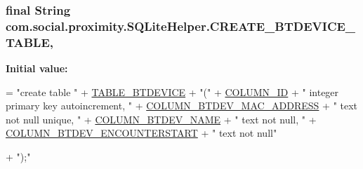 \subsubsection[{C\+R\+E\+A\+T\+E\+\_\+\+B\+T\+D\+E\+V\+I\+C\+E\+\_\+\+T\+A\+B\+L\+E}]{\setlength{\rightskip}{0pt plus 5cm}final String com.\+social.\+proximity.\+S\+Q\+Lite\+Helper.\+C\+R\+E\+A\+T\+E\+\_\+\+B\+T\+D\+E\+V\+I\+C\+E\+\_\+\+T\+A\+B\+L\+E\hspace{0.3cm}{\ttfamily [static]}, {\ttfamily [private]}}\label{classcom_1_1social_1_1proximity_1_1_s_q_lite_helper_a008345746681ebe4ff451e164809f343}
{\bfseries Initial value\+:}
\begin{DoxyCode}
= \textcolor{stringliteral}{"create table "}
              + \hyperlink{classcom_1_1social_1_1proximity_1_1_s_q_lite_helper_a5826d20868ba7e0d81bfb3de783baf07}{TABLE\_BTDEVICE} + \textcolor{stringliteral}{"("}
              + \hyperlink{classcom_1_1social_1_1proximity_1_1_s_q_lite_helper_ae0e5a93fedecddb46106b02b939e4601}{COLUMN\_ID} + \textcolor{stringliteral}{" integer primary key autoincrement, "}
              + \hyperlink{classcom_1_1social_1_1proximity_1_1_s_q_lite_helper_a24fb4cdd15815c0527eecadbb7fb5f12}{COLUMN\_BTDEV\_MAC\_ADDRESS} + \textcolor{stringliteral}{" text not null unique, "}
              + \hyperlink{classcom_1_1social_1_1proximity_1_1_s_q_lite_helper_af43c8ca7e0fb3301d929481e93a6b449}{COLUMN\_BTDEV\_NAME} + \textcolor{stringliteral}{" text not null, "}
              + \hyperlink{classcom_1_1social_1_1proximity_1_1_s_q_lite_helper_aa1144aca9189f5fec6b5e19ac5887e89}{COLUMN\_BTDEV\_ENCOUNTERSTART} + \textcolor{stringliteral}{" text not null"}

              + \textcolor{stringliteral}{");"}
\end{DoxyCode}
\hypertarget{classcom_1_1social_1_1proximity_1_1_s_q_lite_helper_ad6fd653f953e708728c7e84845208638}{}
